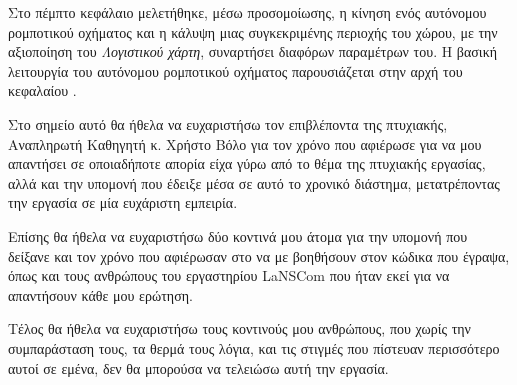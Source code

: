 Στο πέμπτο κεφάλαιο μελετήθηκε, μέσω προσομοίωσης, η κίνηση ενός αυτόνομου ρομποτικού οχήματος και η κάλυψη μιας συγκεκριμένης περιοχής του χώρου, με την αξιοποίηση του \emph{Λογιστικού χάρτη}, συναρτήσει διαφόρων παραμέτρων του. Η βασική λειτουργία του αυτόνομου ρομποτικού οχήματος παρουσιάζεται στην αρχή του κεφαλαίου .

Στο σημείο αυτό θα ήθελα να ευχαριστήσω τον επιβλέποντα της πτυχιακής, Αναπληρωτή Καθηγητή κ. Χρήστο Βόλο για τον χρόνο που αφιέρωσε για να μου απαντήσει σε οποιαδήποτε απορία είχα γύρω από το θέμα της πτυχιακής εργασίας, αλλά και την υπομονή που έδειξε μέσα σε αυτό το χρονικό διάστημα, μετατρέποντας την εργασία σε μία ευχάριστη εμπειρία.

Επίσης θα ήθελα να ευχαριστήσω δύο κοντινά μου άτομα για την υπομονή που δείξανε και τον χρόνο που αφιέρωσαν στο να με βοηθήσουν στον κώδικα που έγραψα, όπως και τους ανθρώπους του εργαστηρίου LaNSCom που ήταν εκεί για να απαντήσουν κάθε μου ερώτηση.

Τέλος θα ήθελα να ευχαριστήσω τους κοντινούς μου ανθρώπους, που χωρίς την συμπαράσταση τους, τα θερμά τους λόγια, και τις στιγμές που πίστευαν περισσότερο αυτοί σε εμένα, δεν θα μπορούσα να τελειώσω αυτή την εργασία.


